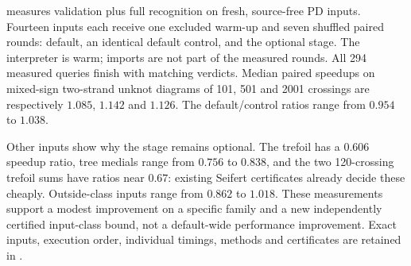  measures validation plus full recognition
on fresh, source-free PD inputs.  Fourteen inputs each receive one excluded
warm-up and seven shuffled paired rounds: default, an identical default
control, and the optional stage.  The interpreter is warm; imports are not
part of the measured rounds.  All 294 measured queries finish with matching
verdicts.  Median paired speedups on mixed-sign two-strand unknot diagrams
of 101, 501 and 2001 crossings are respectively $1.085$, $1.142$ and $1.126$.
The default/control ratios range from $0.954$ to $1.038$.

Other inputs show why the stage remains optional.  The trefoil has a
$0.606$ speedup ratio, tree medials range from $0.756$ to $0.838$, and the
two 120-crossing trefoil sums have ratios near $0.67$: existing Seifert
certificates already decide these cheaply.  Outside-class inputs range
from $0.862$ to $1.018$.  These measurements support a modest improvement
on a specific family and a new independently certified input-class bound,
not a default-wide performance improvement.  Exact inputs, execution order,
individual timings, methods and certificates are retained in
.
